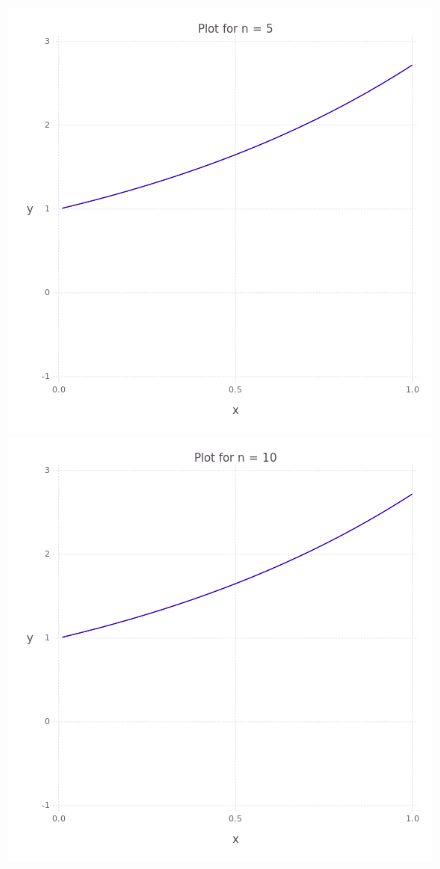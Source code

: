 \begin{figure}
  \begin{multicols}{2}
        \includegraphics[width=\linewidth]{../task-5/plots/myplot-ex-5.png}\par 
        \includegraphics[width=\linewidth]{../task-5/plots/myplot-ex-10.png}\par 

\end{multicols}
\end{figure}
